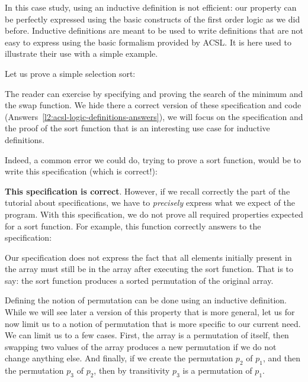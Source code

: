 In this case study, using an inductive definition is not efficient: our
property can be perfectly expressed using the basic constructs of the first
order logic as we did before. Inductive definitions are meant to be used to
write definitions that are not easy to express using the basic formalism
provided by ACSL. It is here used to illustrate their use with a simple
example.



\label{l3:acsl-logic-definitions-inductive-sort}


Let us prove a simple selection sort:




The reader can exercise by specifying and proving the search of the minimum and
the swap function. We hide there a correct version of these specification and
code (Answers~\ref{l2:acsl-logic-definitions-answers}), we will focus on the
specification and the proof of the sort function that is an interesting use case
for inductive definitions.

Indeed, a common error we could do, trying to prove a sort function, would
be to write this specification (which is correct!):




\textbf{This specification is correct}. However, if we recall correctly the part
of the tutorial about specifications, we have to \emph{precisely} express what
we expect of the program. With this specification, we do not prove all required
properties expected for a sort function. For example, this function correctly
answers to the specification:




Our specification does not express the fact that all elements initially present
in the array must still be in the array after executing the sort function. That
is to say: the sort function produces a sorted permutation of the original
array.

Defining the notion of permutation can be done using an inductive definition.
While we will see later a version of this property that is more general, let us
for now limit us to a notion of permutation that is more specific to our current
need. We can limit us to a few cases. First, the array is a permutation of
itself, then swapping two values of the array produces a new permutation if we
do not change anything else. And finally, if we create the permutation $p_2$ of
$p_1$, and then the permutation $p_3$ of $p_2$, then by transitivity $p_3$ is a
permutation of $p_1$.

